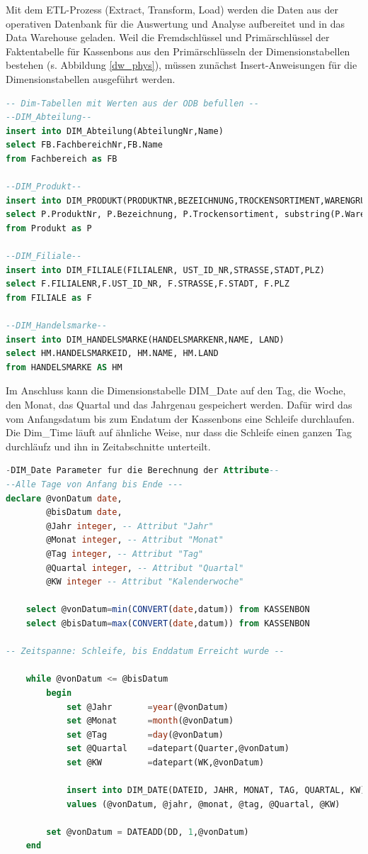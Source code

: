 Mit dem ETL-Prozess (Extract, Transform, Load) werden die Daten aus der operativen Datenbank für die Auswertung und Analyse aufbereitet und in das Data Warehouse geladen. Weil die Fremdschlüssel und Primärschlüssel der Faktentabelle für Kassenbons aus den Primärschlüsseln der Dimensionstabellen bestehen (s. Abbildung \ref{dw_phys}), müssen zunächst Insert-Anweisungen für die Dimensionstabellen ausgeführt werden.

\begin{lstlisting}[language=SQL]
  -- Dim-Tabellen mit Werten aus der ODB befullen --
--DIM_Abteilung--
insert into DIM_Abteilung(AbteilungNr,Name)
select FB.FachbereichNr,FB.Name
from Fachbereich as FB

--DIM_Produkt--
insert into DIM_PRODUKT(PRODUKTNR,BEZEICHNUNG,TROCKENSORTIMENT,WARENGRUPPE)
select P.ProduktNr, P.Bezeichnung, P.Trockensortiment, substring(P.Warengruppe,3,1)
from Produkt as P

--DIM_Filiale--
insert into DIM_FILIALE(FILIALENR, UST_ID_NR,STRASSE,STADT,PLZ)
select F.FILIALENR,F.UST_ID_NR, F.STRASSE,F.STADT, F.PLZ
from FILIALE as F

--DIM_Handelsmarke--
insert into DIM_HANDELSMARKE(HANDELSMARKENR,NAME, LAND)
select HM.HANDELSMARKEID, HM.NAME, HM.LAND
from HANDELSMARKE AS HM
\end{lstlisting}

Im Anschluss kann die Dimensionstabelle DIM\_Date auf den Tag, die Woche, den Monat, das Quartal und das Jahrgenau gespeichert werden. Dafür wird das vom Anfangsdatum bis zum Endatum der Kassenbons eine Schleife durchlaufen. Die Dim\_Time läuft auf ähnliche Weise, nur dass die Schleife einen ganzen Tag durchläufz und ihn in Zeitabschnitte unterteilt.

\begin{lstlisting}[language=SQL]
  -DIM_Date Parameter fur die Berechnung der Attribute--
--Alle Tage von Anfang bis Ende ---
declare @vonDatum date,
		@bisDatum date,
		@Jahr integer, -- Attribut "Jahr"
		@Monat integer, -- Attribut "Monat"
		@Tag integer, -- Attribut "Tag"
		@Quartal integer, -- Attribut "Quartal"
		@KW integer -- Attribut "Kalenderwoche"

	select @vonDatum=min(CONVERT(date,datum)) from KASSENBON
	select @bisDatum=max(CONVERT(date,datum)) from KASSENBON

-- Zeitspanne: Schleife, bis Enddatum Erreicht wurde --

	while @vonDatum <= @bisDatum
		begin
			set @Jahr		=year(@vonDatum)
			set @Monat		=month(@vonDatum)
			set @Tag		=day(@vonDatum)
			set @Quartal	=datepart(Quarter,@vonDatum)
			set @KW			=datepart(WK,@vonDatum)

			insert into DIM_DATE(DATEID, JAHR, MONAT, TAG, QUARTAL, KW)
			values (@vonDatum, @jahr, @monat, @tag, @Quartal, @KW)

		set @vonDatum = DATEADD(DD, 1,@vonDatum)
	end
\end{lstlisting}

